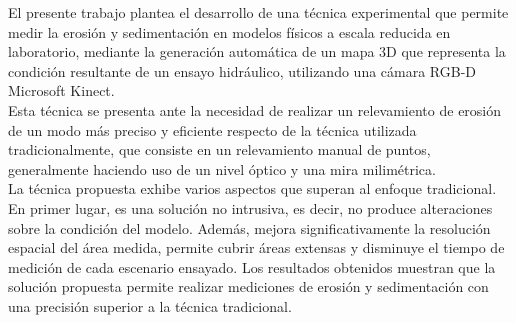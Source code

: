 \begin{resumen}

El presente trabajo plantea el desarrollo de una técnica experimental que permite medir la erosión y sedimentación en modelos físicos a escala reducida en laboratorio, mediante la generación automática de un mapa 3D que representa la condición resultante de un ensayo hidráulico, utilizando una cámara RGB-D Microsoft Kinect. \\
Esta técnica se presenta ante la necesidad de realizar un relevamiento de erosión de un modo más preciso y eficiente respecto de la técnica utilizada tradicionalmente, que consiste en un relevamiento manual de puntos, generalmente haciendo uso de un nivel óptico y una mira milimétrica.\\ 
La técnica propuesta exhibe varios aspectos que superan al enfoque tradicional. En primer lugar, es una solución no intrusiva, es decir, no produce alteraciones sobre la condición del modelo. Además, mejora significativamente la resolución espacial del área medida, permite cubrir áreas extensas y disminuye el tiempo de medición de cada escenario ensayado. Los resultados obtenidos muestran que la solución propuesta permite realizar mediciones de erosión y sedimentación con una precisión superior a la técnica tradicional. \\

\end{resumen}